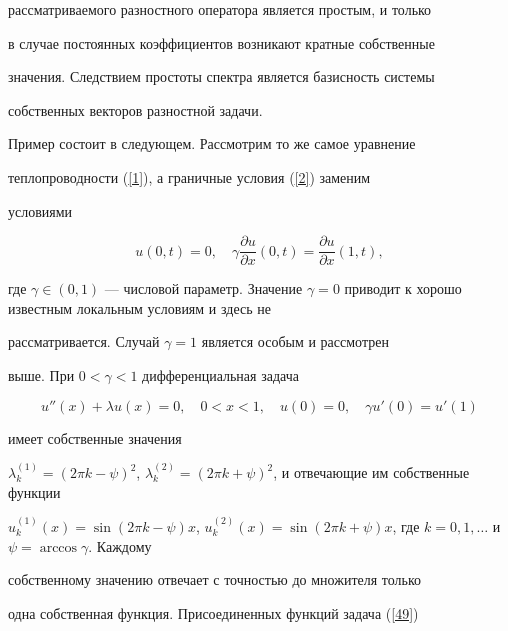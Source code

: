 рассматриваемого разностного оператора является простым, и только


в случае постоянных коэффициентов возникают кратные собственные


значения. Следствием простоты спектра является базисность системы


собственных векторов разностной задачи.





Пример состоит в следующем. Рассмотрим то же самое уравнение


теплопроводности (\ref{1}), а граничные условия (\ref{2}) заменим


условиями


\begin{equation}\label{48}


u(0,t)=0,\quad \gamma\frac{{\partial u}}{{\partial x}}(0,t)=


\frac{{\partial u}}{{\partial x}}(1,t),


\end{equation}


где $\gamma \in (0,1)$ --- числовой параметр. Значение $\gamma


=0$ приводит к хорошо известным локальным условиям и здесь не


рассматривается. Случай $\gamma=1$ является особым и рассмотрен


выше. При $0<\gamma <1$ дифференциальная задача


\begin{equation}\label{49}


u''(x)+\lambda u(x)=0,\quad 0<x<1, \quad


u(0)=0, \quad \gamma u'(0)=u'(1)


\end{equation}


имеет собственные значения


$\lambda_{k}^{(1)}=(2\pi k -\psi)^2$, $\lambda_{k}^{(2)}=(2\pi k


+\psi)^2$, и отвечающие им собственные функции 


$u_{k}^{(1)}(x)=\sin(2\pi k -\psi)x$, $u_{k}^{(2)}(x)=\sin(2\pi k


+\psi)x$, где $k=0,1,\dotsc$ и $\psi=\arccos \gamma$. Каждому


собственному значению отвечает с точностью до множителя только


одна собственная функция. Присоединенных функций задача (\ref{49})


